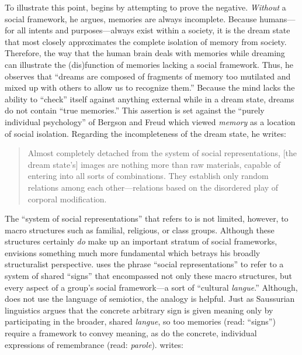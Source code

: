 To illustrate this point, \halbwachs begins  by attempting to prove the negative. \emph{Without} a social framework, he argues, memories are always incomplete. Because humans---for all intents and purposes---always exist within a society, it is the dream state that most closely approximates the complete isolation of memory from society. Therefore, the way that the human brain deals with memories while dreaming can illustrate the (dis)function of memories lacking a social framework. Thus, he observes that ``dreams are composed of fragments of memory too mutilated and mixed up with others to allow us to recognize them.''\autocite[41]{halbwachs1992} Because the mind lacks the ability to ``check'' itself against anything external while in a dream state, dreams do not contain ``true memories.''\autocite[41]{halbwachs1992} This assertion is set against the ``purely individual psychology'' of Bergson and Freud which viewed \emph{memory} as a location of social isolation.\autocites[See][]{ansellpearson_radstone-schwarz2011}[and][]{terdiman_radstone-schwarz2011} Regarding the incompleteness of the dream state, he writes:  

\begin{quote} Almost completely detached from the system of social representations, {[}the dream state's{]} images are nothing more than raw materials, capable of entering into all sorts of combinations. They establish only random relations among each other---relations based on the disordered play of corporal modification.\autocite[42]{halbwachs1992} \end{quote}  

The ``system of social representations'' that \halbwachs refers to is not limited, however, to macro structures such as familial, religious, or class groups. Although these structures certainly \emph{do} make up an important stratum of social frameworks, \halbwachs envisions something much more fundamental which betrays his broadly structuralist perspective. \halbwachs uses the phrase ``social representations'' to refer to a system of shared ``signs'' that encompassed not only these macro structures, but every aspect of a group's social framework---a sort of ``cultural \emph{langue}.'' Although, \halbwachs does not use the language of semiotics, the analogy is helpful. Just as Saussurian linguistics argues that the concrete arbitrary sign is given meaning only by participating in the broader, shared \emph{langue}, so too memories (read: ``signs'') require a framework to convey meaning, as do the concrete, individual expressions of remembrance (read: \emph{parole}). \halbwachs writes:  


